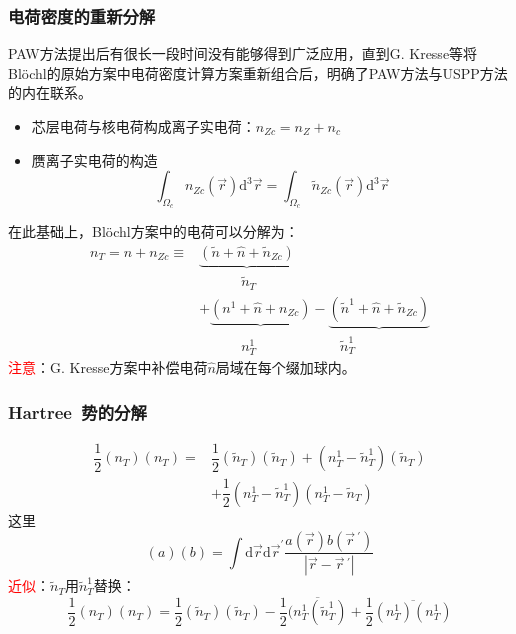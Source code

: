 \documentclass[cjk,slidestop,compress,mathserif,blue]{beamer}
\begin{document}

\frame
{
\frametitle{电荷密度的重新分解}
\textrm{PAW}方法提出后有很长一段时间没有能够得到广泛应用，直到\textrm{G. Kresse}等将\textrm{Bl\"ochl}的原始方案中电荷密度计算方案重新组合后，明确了\textrm{PAW}方法与\textrm{USPP}方法的内在联系。
\begin{itemize}
	\item 芯层电荷与核电荷构成离子实电荷：$n_{Zc}=n_Z+n_c$
	\item 赝离子实电荷的构造$$\int_{\Omega_c}n_{Zc}(\vec r)\mathrm{d}^3\vec r=\int_{\Omega_c}\tilde n_{Zc}(\vec r)\mathrm{d}^3\vec r$$
\end{itemize}
在此基础上，\textrm{Bl\"ochl}方案中的电荷可以分解为：
\begin{displaymath}
	\begin{aligned}
		n_T=n+n_{Zc}\equiv&\underbrace{(\tilde n+\hat n+\tilde n_{Zc})}\\
				 		&\quad\qquad\tilde n_T\\
				  &+\underbrace{(n^1+\hat n+n_{Zc})}-\underbrace{(\tilde n^1+\hat n+\tilde n_{Zc})}\\
				                  &\quad\qquad n_T^1\qquad\qquad\qquad\tilde n_T^1
	\end{aligned}
\end{displaymath}
\textcolor{red}{注意}：\textrm{G. Kresse}方案中补偿电荷$\hat n$局域在每个缀加球内。
}

\frame
{
	\frametitle{\textrm{Hartree~}势的分解}
\begin{displaymath}
	\begin{aligned}
		\dfrac12(n_T)(n_T)=&\dfrac12(\tilde n_T)(\tilde n_T)+(n_T^1-\tilde n_T^1)(\tilde n_T)\\
				&+\dfrac12(n_T^1-\tilde n_T^1)(n_T^1-\tilde n_T)
	\end{aligned}
\end{displaymath}
这里$$(a)(b)=\int\mathrm{d}\vec r\mathrm{d}\vec r^{\prime}\dfrac{a(\vec r)b(\vec r\,^{\prime})}{|\vec r-\vec r\,^{\prime}|}$$
\textcolor{red}{近似}：$\tilde n_T$用$\tilde n_T^1$替换：
\begin{displaymath}
	\dfrac12(n_T)(n_T)=\dfrac12(\tilde n_T)(\tilde n_T)-\dfrac12\overline{(n_T^1(\tilde n_T^1)}+\dfrac12\overline{(n_T^1)(n_T^1)}
\end{displaymath}
}
\end{document}
